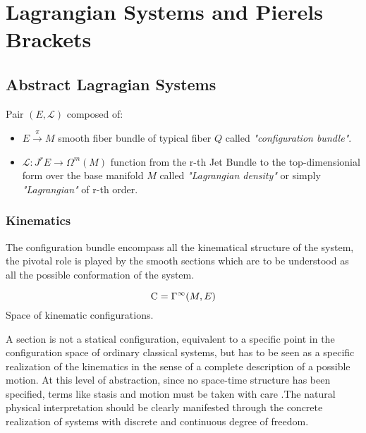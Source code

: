 \documentclass[Main]{subfiles}
\begin{document}
\chapter{Lagrangian Systems and Pierels Brackets}


	\section{Abstract Lagragian Systems}
	
	\begin{definition}
	Pair $(E, \mathcal{L} )$ composed of:
		\begin{itemize}
			\item $E \xrightarrow{\pi} M$ smooth fiber bundle of typical fiber $Q$ called \emph{"configuration bundle"}.
			\item	$ \mathcal{L} : J^r E \rightarrow \Omega^m (M)$ function from the r-th Jet Bundle to  the top-dimensionial form over the base manifold $M$  called \emph{"Lagrangian density"} or simply \emph{"Lagrangian"} of r-th order.
		\end{itemize}
	\end{definition}	
	
	
	\subsection{Kinematics}
	The configuration bundle encompass all the kinematical structure of the system, the pivotal role is played by the smooth sections  which are to be understood as all the possible conformation of the system.

	\begin{notationfix}
		\begin{displaymath}
			\mathrm{C}= \Gamma^\infty(M,E)
		\end{displaymath}
		Space of kinematic configurations.
	\end{notationfix}

	A section is not a statical configuration, equivalent to a specific point in the configuration space of ordinary classical systems, but has to be seen as a specific realization of the kinematics in the sense of  a complete description of a possible motion.
	At this level of abstraction, since no space-time structure has been specified, terms like stasis and motion must be taken with care .The natural physical interpretation should be clearly manifested through the concrete realization of systems with discrete and continuous degree of freedom.
	
\end{document}
